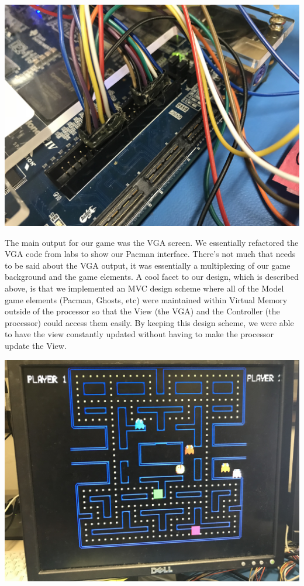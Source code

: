 \documentclass[letterpaper]{article} %
\begin{document}
	\begin{center}
		\includegraphics[scale=.07]{fpga_connection}
	\end{center}\par
	The main output for our game was the VGA screen. We essentially refactored the VGA code from labs to show our Pacman interface. There's not much that needs to be said about the VGA output, it was essentially a multiplexing of our game background and the game elements. A cool facet to our design, which is described above, is that we implemented an MVC design scheme where all of the Model game elements (Pacman, Ghosts, etc) were maintained within Virtual Memory outside of the processor so that the View (the VGA) and the Controller (the processor) could access them easily. By keeping this design scheme, we were able to have the view constantly updated without having to make the processor update the View. \par
	\begin{center}
		\includegraphics[scale=.07]{vga_screen}
	\end{center}\par
	
\end{document}
